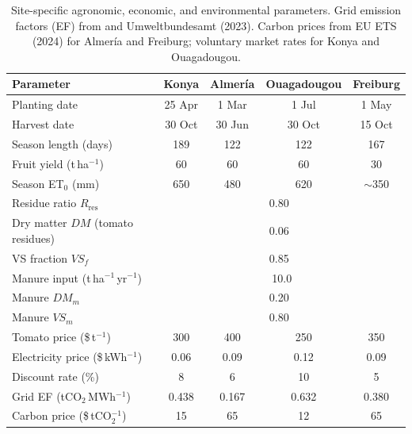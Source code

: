 \begin{table}[H]
\caption{Site-specific agronomic, economic, and environmental parameters.
Grid emission factors (EF) from \citet{iea2025} and Umweltbundesamt (2023).
Carbon prices from EU ETS (2024) for Almer\'{i}a and Freiburg;
voluntary market rates for Konya and Ouagadougou.}
\label{tab:crop}
\centering
\begin{tabular}{lcccc}
\toprule
\textbf{Parameter} & \textbf{Konya} & \textbf{Almer\'{i}a}
    & \textbf{Ouagadougou} & \textbf{Freiburg} \\
\midrule
Planting date           & 25 Apr  & 1 Mar   & 1 Jul   & 1 May   \\
Harvest date            & 30 Oct  & 30 Jun  & 30 Oct  & 15 Oct  \\
Season length (days)    & 189     & 122     & 122     & 167     \\
Fruit yield (t\,ha$^{-1}$) & 60  & 60      & 60      & 30      \\
Season ET$_0$ (mm)      & 650     & 480     & 620     & $\sim$350 \\
Residue ratio $R_{\text{res}}$ & \multicolumn{4}{c}{0.80~\citep{mohammedi2023}} \\
Dry matter $DM$ (tomato residues) & \multicolumn{4}{c}{0.06~\citep{mohammedi2023}} \\
VS fraction $VS_f$      & \multicolumn{4}{c}{0.85~\citep{lallement2023}} \\
Manure input (t\,ha$^{-1}$\,yr$^{-1}$) & \multicolumn{4}{c}{10.0} \\
Manure $DM_m$           & \multicolumn{4}{c}{0.20~\citep{pilarski2025}} \\
Manure $VS_m$           & \multicolumn{4}{c}{0.80~\citep{pilarski2025}} \\
\midrule
Tomato price (\$\,t$^{-1}$) & 300 & 400  & 250     & 350     \\
Electricity price (\$\,kWh$^{-1}$) & 0.06 & 0.09 & 0.12 & 0.09 \\
Discount rate (\%)      & 8       & 6       & 10      & 5       \\
Grid EF (tCO$_2$\,MWh$^{-1}$) & 0.438 & 0.167 & 0.632 & 0.380 \\
Carbon price (\$\,tCO$_2^{-1}$) & 15  & 65    & 12      & 65      \\
\bottomrule
\end{tabular}
\end{table}

